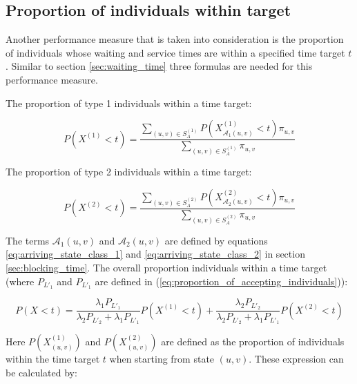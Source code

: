 \subsection{Proportion of individuals within target}\label{sec:proportion_within_target}

Another performance measure that is taken into consideration is the proportion 
of individuals whose waiting and service times are within a specified 
time target \(t\).
Similar to section \ref{sec:waiting_time} three formulas are needed for this 
performance measure.

The proportion of type 1 individuals within a time target:

\begin{equation}\label{eq:proportion_within_target_type_1}
    P(X^{(1)} < t) = \frac{\sum_{(u,v) \in S_A^{(1)}} 
    P(X_{\mathcal{A}_1(u,v)}^{(1)} < t) 
    \pi_{u,v} }{\sum_{(u,v) \in S_A^{(1)}} \pi_{u,v}}
\end{equation}

The proportion of type 2 individuals within a time target:

\begin{equation}\label{eq:proportion_within_target_type_2}
    P(X^{(2)} < t) = \frac{\sum_{(u,v) \in S_A^{(2)}} 
    P(X_{\mathcal{A}_2(u,v)}^{(2)} < t) 
    \pi_{u,v} }{\sum_{(u,v) \in S_A^{(2)}} \pi_{u,v}}
\end{equation}

The terms \(\mathcal{A}_1(u,v)\) and \(\mathcal{A}_2(u,v)\) are defined by
equations \ref{eq:arriving_state_class_1} and \ref{eq:arriving_state_class_2}
in section \ref{sec:blocking_time}.
The overall proportion individuals within a time target (where \(P_{L'_1}\) and 
\(P_{L'_1}\) are defined in (\ref{eq:proportion_of_accepting_individuals})):

\begin{equation}\label{eq:overall_proportion_within_target}
    P(X < t) = \frac{\lambda_1 P_{L'_1}}{\lambda_2 P_{L'_2}+\lambda_1 P_{L'_1}} 
    P(X^{(1)} < t) + \frac{\lambda_2 P_{L'_2}}{\lambda_2 P_{L'_2} + 
    \lambda_1 P_{L'_1}} P(X^{(2)} < t) 
\end{equation}

Here \(P(X_{(u,v)}^{(1)})\) and \(P(X_{(u,v)}^{(2)})\) are defined as the
proportion of individuals within the time target \(t\) when starting from state 
\((u,v)\).
These expression can be calculated by:

